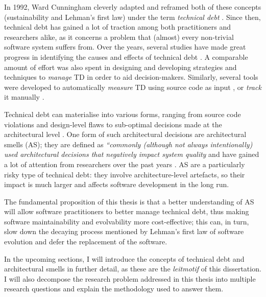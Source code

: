 In 1992, Ward Cunningham cleverly adapted and reframed both of these concepts (sustainability and Lehman's first law) under the term \emph{technical debt} \cite{Cunningham1992}. 
Since then, technical debt has gained a lot of traction among both practitioners and researchers alike, as it concerns a problem that (almost) every non-trivial software system suffers from. 
Over the years, several studies have made great progress in identifying the causes and effects of technical debt \cite{Brown2010,Kruchten2012}.
A comparable amount of effort was also spent in designing and developing strategies and techniques to \emph{manage} TD \cite{Li2015} in order to aid decision-makers. 
Similarly, several tools were developed to automatically \emph{measure} TD using source code as input \cite{Avgeriou2021}, or \emph{track} it manually \cite{Martini2016}.

Technical debt can materialise into various forms, ranging from source code violations \cite{Letouzey2012,Curtis2012} and design-level flaws \cite{Marinescu2012} to sub-optimal decisions made at the architectural level \cite{Ernst2015,Yli-Huumo2014}. One form of such architectural decisions are architectural smells (AS); they are defined as \emph{``commonly (although not always intentionally) used architectural decisions that negatively impact system quality} \cite{Garcia2009} and have gained a lot of attention from researchers over the past years \cite{Verdecchia2018}.
AS are a particularly risky type of technical debt: they involve architecture-level artefacts, so their impact is much larger and affects software development in the long run. 

The fundamental proposition of this thesis is that a better understanding of AS will allow software practitioners to better manage technical debt, thus making software maintainability and evolvability more cost-effective; this can, in turn, slow down the decaying process mentioned by Lehman's first law of software evolution and defer the replacement of the software.

In the upcoming sections, I will introduce the concepts of technical debt and architectural smells in further detail, as these are the \emph{leitmotif} of this dissertation.
I will also decompose the research problem addressed in this thesis into multiple research questions and explain the methodology used to answer them.


